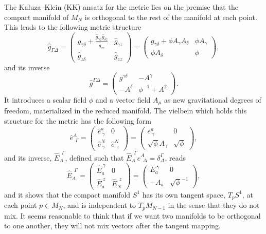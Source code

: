 \documentclass[aps,prd,12pt,superscriptaddress,showpacs,showkeys,longbibliography,reprint,nofootinbib]{revtex4-1}
\begin{document}
The Kaluza--Klein (KK) ansatz for the metric lies on the premise that the compact manifold of $M_N$ is orthogonal to the rest of the manifold at each point. This leads to the following metric structure
\begin{equation}
  \hat{g}_{\Gamma\Delta} =
  \begin{pmatrix}
    g_{\gamma\delta} +\frac{\hat{g}_{\gamma z}\hat{g}_{\delta z}}{\hat{g}_{zz}}&\hat{g}_{\gamma z}\\
    \hat{g}_{z\delta} & \hat{g}_{zz}
  \end{pmatrix}
  =
  \begin{pmatrix}
    g_{\gamma\delta} + \phi A_\gamma A_\delta&\phi A_\gamma\\
    \phi A_{\delta} & \phi
  \end{pmatrix},
\end{equation}
and its inverse
\begin{equation}
  \hat{g}^{\Gamma\Delta}=
  \begin{pmatrix}
    g^{\gamma\delta}&-A^\gamma\\
    -A^{\delta} & \phi^{-1}+A^2
  \end{pmatrix}.
\end{equation}
It introduces a scalar field $\phi$ and a vector field $A_\mu$ as new gravitational degrees of freedom, materialized in the reduced manifold. The vielbein which holds this structure for the metric has the following form
\begin{equation}
  \label{Dvielbein}
  \hat{e}^A_{\ \ \Gamma} =
  \begin{pmatrix}
    \hat{e}^a_{\ \gamma}& 0\\
    \hat{e}^N_{\ \gamma} & \hat{e}^N_{\ \ z}
  \end{pmatrix}
  =
  \begin{pmatrix}
    e^a_{\ \gamma}& 0\\
    \sqrt{\phi}A_\gamma & \sqrt{\phi}
  \end{pmatrix},
\end{equation}
and its inverse, $\hat{E}_A^{\ \ \Gamma}$, defined such that $\hat{E}_A^{\ \ \Gamma}\hat{e}^A_{\ \ \Delta}=\delta^\Gamma_{\Delta}$, reads
\begin{equation}
  \label{Dinversevielbein}
  \hat{E}_A^{\ \ \Gamma} =
  \begin{pmatrix}
    \hat{E}_a^{\ \gamma}& 0\\
    \hat{E}_a^{\ z} & \hat{E}_N^{\ \ z}
  \end{pmatrix}
  =
  \begin{pmatrix}
    E_a^{\ \gamma}& 0\\
    -A_a & \sqrt{\phi}^{-1}
  \end{pmatrix},
\end{equation}
and it shows that the compact manifold $S^1$ has its own tangent space, $T_pS^1$, at each point $p\in M_N$, and is independent to $T_pM_{N-1}$ in the sense that they do not mix. It seems reasonable to think that if we want two manifolds to be orthogonal to one another, they will not mix vectors after the tangent mapping.
\end{document}
